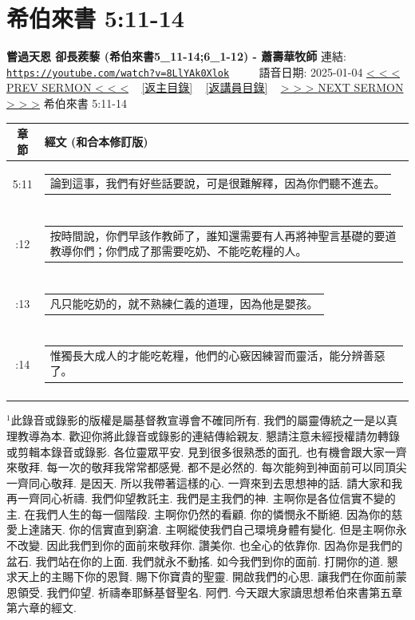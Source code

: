\documentclass{book}
\begin{document}
\section{希伯來書 5:11-14}
\label{sec:8LlYAk0Xlok}
\textbf{嘗過天恩 卻長蒺藜 (希伯來書5\_11-14;6\_1-12) - 蕭壽華牧師}
\newline
\newline
連結: \href{https://youtube.com/watch?v=8LlYAk0Xlok}{\texttt{https://youtube.com/watch?v=8LlYAk0Xlok}} ~~~~ 語音日期: 2025-01-04
\newline
\newline
\hyperref[sec:toZa1ewaUWE]{< < < PREV SERMON < < <}
~
\hyperlink{toc}{[返主目錄]}
~
\hyperref[ch:preacher8]{[返講員目錄]}
~
\hyperref[sec:QwQqFfjJiJo]{> > > NEXT SERMON > > >}
\newline
\newline
希伯來書 5:11-14
\newline
\begin{longtable}{cl}
\hline
\hline
章節 & 經文 (和合本修訂版)\\
\hline
5:11 & \begin{tabularx}{0.7\textwidth}{X} 論到這事，我們有好些話要說，可是很難解釋，因為你們聽不進去。 \end{tabularx} \\ \\ \relax
5:12 & \begin{tabularx}{0.7\textwidth}{X} 按時間說，你們早該作教師了，誰知還需要有人再將神聖言基礎的要道教導你們；你們成了那需要吃奶、不能吃乾糧的人。 \end{tabularx} \\ \\ \relax
5:13 & \begin{tabularx}{0.7\textwidth}{X} 凡只能吃奶的，就不熟練仁義的道理，因為他是嬰孩。 \end{tabularx} \\ \\ \relax
5:14 & \begin{tabularx}{0.7\textwidth}{X} 惟獨長大成人的才能吃乾糧，他們的心竅因練習而靈活，能分辨善惡了。 \end{tabularx} \\ \\
[1ex]
\hline
\hline
\end{longtable}
$^{1}$此錄音或錄影的版權是屬基督教宣導會不確同所有.
我們的屬靈傳統之一是以真理教導為本.
歡迎你將此錄音或錄影的連結傳給親友.
懇請注意未經授權請勿轉錄或剪輯本錄音或錄影.
各位靈眾平安.
見到很多很熟悉的面孔.
也有機會跟大家一齊來敬拜.
每一次的敬拜我常常都感覺.
都不是必然的.
每次能夠到神面前可以同頂尖一齊同心敬拜.
是因天.
所以我帶著這樣的心.
一齊來到去思想神的話.
請大家和我再一齊同心祈禱.
我們仰望教託主.
我們是主我們的神.
主啊你是各位信實不變的主.
在我們人生的每一個階段.
主啊你仍然的看顧.
你的憐憫永不斷絕.
因為你的慈愛上達諸天.
你的信實直到窮滄.
主啊縱使我們自己環境身體有變化.
但是主啊你永不改變.
因此我們到你的面前來敬拜你.
讚美你.
也全心的依靠你.
因為你是我們的盆石.
我們站在你的上面.
我們就永不動搖.
如今我們到你的面前.
打開你的道.
懇求天上的主賜下你的恩賢.
賜下你寶貴的聖靈.
開啟我們的心思.
讓我們在你面前蒙恩領受.
我們仰望.
祈禱奉耶穌基督聖名.
阿們.
今天跟大家讀思想希伯來書第五章第六章的經文.
\end{document}
